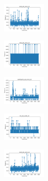 \begin{figure}[H]
\begin{subfigure}
    \end{subfigure}
    \hfill
    \begin{subfigure}
        \centering
        \includegraphics[width=0.234\textwidth]{img/aggun/ecoli_set_const_10_589741062_time.png}
    \end{subfigure}
    \hfill
    \begin{subfigure}
        \centering
        \includegraphics[width=0.234\textwidth]{img/aggun/rand_set_const_10_589741062_time.png}
    \end{subfigure}
    \hfill
    \begin{subfigure}
        \centering
        \includegraphics[width=0.234\textwidth]{img/aggun/newthyroid_set_const_10_589741062_time.png}
    \end{subfigure}
    \hfill
    \begin{subfigure}
        \centering
        \includegraphics[width=0.234\textwidth]{img/aggun/iris_set_const_10_277451237_time.png}
    \end{subfigure}
    \hfill
    \begin{subfigure}
        \centering
        \includegraphics[width=0.234\textwidth]{img/aggun/ecoli_set_const_10_277451237_time.png}
    \end{subfigure}
    \hfill

\end{figure}
